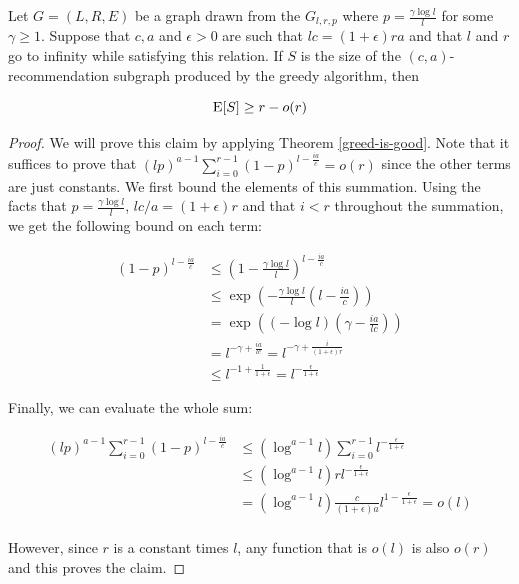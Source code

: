 \begin{thm}
Let $G=(L,R,E)$ be a graph drawn from the $G_{l,r,p}$ where $p = \frac{\gamma \log l}{l}$ for some $\gamma \geq 1$. Suppose that $c, a$ and $\epsilon>0$ are such that $lc=(1+\epsilon)ra$ and that $l$ and $r$ go to infinity while satisfying this relation. If $S$ is the size of the $(c,a)$-recommendation subgraph produced by the greedy algorithm, then

\[ \text{E}[S] \geq r - o(r) \]
\end{thm}
\begin{proof}
We will prove this claim by applying Theorem \ref{greed-is-good}. Note that it suffices to prove that $(lp)^{a-1}\sum_{i=0}^{r-1}(1-p)^{l-\frac{ia}{c}} = o(r)$ since the other terms are just constants. We first bound the elements of this summation. Using the facts that $p = \frac{\gamma \log l}{l}$, $lc/a = (1+\epsilon)r$ and that $i<r$ throughout the summation, we get the following bound on each term:

\begin{align*}
       (1-p)^{l-\frac{ia}{c}} 
&\leq  \left(1-\frac{\gamma \log l}{l}\right)^{l-\frac{ia}{c}} \\
&\leq  \exp\left(-\frac{\gamma \log l}{l}\left(l-\frac{ia}{c}\right)\right) \\ 
&=     \exp\left((-\log l)\left(\gamma - \frac{ia}{lc}\right)\right) \\
&=     l^{-\gamma+\frac{ia}{lc}} = l^{-\gamma+\frac{i}{(1+\epsilon)r}} \\
&\leq  l^{-1+\frac{1}{1+\epsilon}} = l^{-\frac{\epsilon}{1+\epsilon}}
\end{align*}

Finally, we can evaluate the whole sum:

\begin{align*}
       (lp)^{a-1}  \sum_{i=0}^{r-1}(1-p)^{l-\frac{ia}{c}}
&\leq  \left(\log^{a-1}l\right) \sum_{i=0}^{r-1}l^{-\frac{\epsilon}{1+\epsilon}}\\
&\leq  \left(\log^{a-1}l\right) rl^{-\frac{\epsilon}{1+\epsilon}}\\
&=     \left(\log^{a-1}l\right) \frac{c}{(1+\epsilon)a}l^{1-\frac{\epsilon}{1+\epsilon}} = o(l)\\
\end{align*}

However, since $r$ is a constant times $l$, any function that is $o(l)$ is also $o(r)$ and this proves the claim.

\end{proof}









